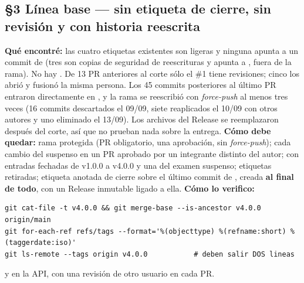 \subsection*{\S3 L\'inea base --- sin etiqueta de cierre, sin revisi\'on y con historia reescrita}
\textbf{Qu\'e encontr\'e:} las cuatro etiquetas existentes son ligeras y ninguna apunta a un commit de  (tres son copias de seguridad de reescrituras y  apunta a , fuera de la rama). No hay . De 13 PR anteriores al corte s\'olo el \#1 tiene revisiones; cinco los abri\'o y fusion\'o la misma persona. Los 45 commits posteriores al \'ultimo PR entraron directamente en , y la rama se reescribi\'o con \emph{force-push} al menos tres veces (16 commits descartados el 09/09, siete reaplicados el 10/09 con otros autores y uno eliminado el 13/09). Los archivos del Release  se reemplazaron despu\'es del corte, as\'i que no prueban nada sobre la entrega. \textbf{C\'omo debe quedar:} rama  protegida (PR obligatorio, una aprobaci\'on, sin \emph{force-push}); cada cambio del suspenso en un PR aprobado por un integrante distinto del autor;  con entradas fechadas de v1.0.0 a v4.0.0 y una del examen suspenso; etiquetas  retiradas; etiqueta anotada de cierre sobre el \'ultimo commit de , creada \textbf{al final de todo}, con un Release inmutable ligado a ella. \textbf{C\'omo lo verifico:}\begin{verbatim}
git cat-file -t v4.0.0 && git merge-base --is-ancestor v4.0.0 origin/main
git for-each-ref refs/tags --format='%(objecttype) %(refname:short) %(taggerdate:iso)'
git ls-remote --tags origin v4.0.0           # deben salir DOS lineas
\end{verbatim}
y en la API,  con una revisi\'on  de otro usuario en cada PR.

